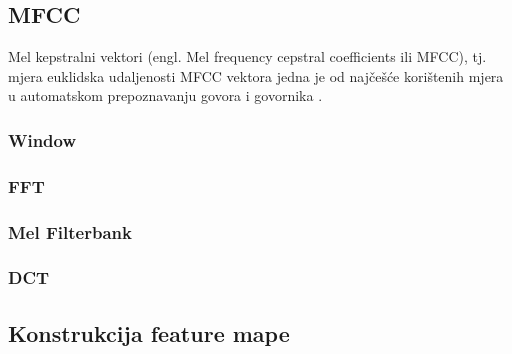 \subsection{MFCC}
\label{MFCCconstruction}
Mel kepstralni vektori (engl. Mel frequency cepstral coefficients ili MFCC), tj. mjera 
euklidska udaljenosti MFCC vektora jedna je od najčešće korištenih mjera u automatskom 
prepoznavanju govora i govornika \cite{vasilijevic2011perceptual}.





\subsubsection{Window}
\subsubsection{FFT}
\subsubsection{Mel Filterbank}
\subsubsection{DCT}

\subsection{Konstrukcija feature mape}

